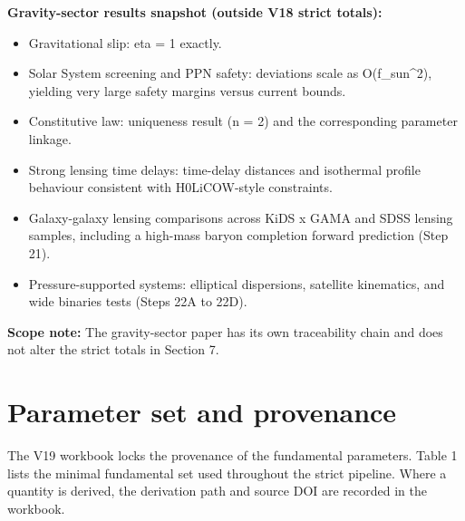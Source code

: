 \documentclass[11pt,a4paper]{article}
\begin{document}
\begin{mdframed}[linecolor=accent,linewidth=0.5pt,backgroundcolor=callout-bg,leftline=true,rightline=true,topline=true,bottomline=true,innerleftmargin=8pt,innerrightmargin=8pt,innertopmargin=6pt,innerbottommargin=6pt]
\textbf{Gravity-sector results snapshot (outside V18 strict totals):}\begin{itemize}
  \item Gravitational slip: eta = 1 exactly.
  \item Solar System screening and PPN safety: deviations scale as O(f\_\allowbreak{}sun\^{}2), yielding very large safety margins versus current bounds.
  \item Constitutive law: uniqueness result (n = 2) and the corresponding parameter linkage.
  \item Strong lensing time delays: time-delay distances and isothermal profile behaviour consistent with H0LiCOW-style constraints.
  \item Galaxy-galaxy lensing comparisons across KiDS x GAMA and SDSS lensing samples, including a high-mass baryon completion forward prediction (Step 21).
  \item Pressure-supported systems: elliptical dispersions, satellite kinematics, and wide binaries tests (Steps 22A to 22D).
\end{itemize}
\end{mdframed}

\textbf{Scope note:} The gravity-sector paper has its own traceability chain and does not alter the strict totals in Section 7.

\section{Parameter set and provenance}
\label{sec:sec5}
The V19 workbook locks the provenance of the fundamental parameters. Table 1 lists the minimal fundamental set used throughout the strict pipeline. Where a quantity is derived, the derivation path and source DOI are recorded in the workbook.
\end{document}
